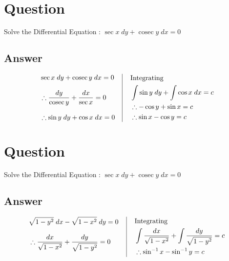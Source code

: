 \documentclass[17pt]{extarticle}
\newcommand{\cosec}{\operatorname{cosec}}
\begin{document}
\noindent
\begin{fleqn} 


\section{Question} 
Solve the Differential Equation : \quad $ \sec x\;dy + \cosec y\;dx = 0$

\subsection*{Answer}
\begin{equation} \nonumber
\begin{alignedat}{4}
&  \sec x\;dy + \cosec y\;dx = 0 \quad \\[8pt]
& \therefore \frac{dy}{\cosec y}+ \frac{dx}{\sec x}=0 \\[8pt]
& \therefore \sin y \;dy + \cos x\; dx=0\\
\end{alignedat}
\,
\vrule
\quad
\, 
\begin{alignedat}{4}
& \text{Integrating }\\
& \int \sin y\;dy + \int \cos x\;dx= c \\
& \therefore-\cos y + \sin x = c\\
& \therefore\sin x - \cos y = c\\
\end{alignedat}
\end{equation}


\section{Question} 
Solve the Differential Equation : \quad $ \sec x\;dy + \cosec y\;dx = 0$

\subsection*{Answer}
\begin{equation} \nonumber
\begin{alignedat}{4}
&  \sqrt{1 -y^2}\;dx - \sqrt{1-x^2}\; dy = 0 \quad \\[8pt]
& \therefore \frac{dx}{\sqrt{1 - x^2}}+ \frac{dy}{\sqrt{1 - y^2}}=0 \\[8pt]
\end{alignedat}
\,
\vrule
\quad
\, 
\begin{alignedat}{4}
& \text{Integrating }\\
& \int \frac{dx}{\sqrt{1 - x^2}}+ \int \frac{dy}{\sqrt{1 - y^2}}=c \\
& \therefore \sin^{-1} x - \sin^{-1} y = c\\
\end{alignedat}
\end{equation}


\end{fleqn}
\end{document}
